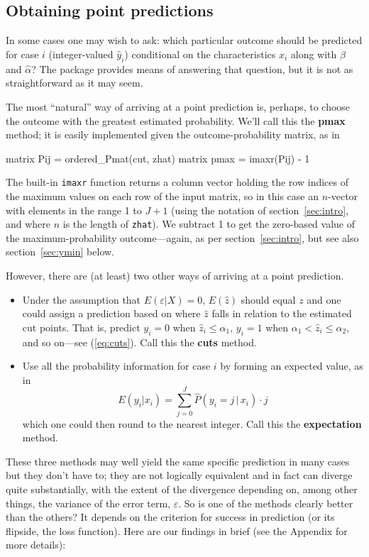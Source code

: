 \documentclass{article}
\begin{document}
\subsection{Obtaining point predictions}
\label{sec:point-pred}

In some cases one may wish to ask: which particular outcome should be
predicted for case $i$ (integer-valued $\hat{y}_i$) conditional on the
characteristics $x_i$ along with $\hat\beta$ and $\hat\alpha$? The
package provides means of answering that question, but it is not as
straightforward as it may seem.

The most ``natural'' way of arriving at a point prediction is,
perhaps, to choose the outcome with the greatest estimated
probability. We'll call this the \textbf{pmax} method; it is easily
implemented given the outcome-probability matrix, as in
\begin{code}
matrix Pij = ordered_Pmat(cut, zhat)
matrix pmax = imaxr(Pij) - 1
\end{code}
The built-in \texttt{imaxr} function returns a column vector holding
the row indices of the maximum values on each row of the input matrix,
so in this case an $n$-vector with elements in the range 1 to $J+1$
(using the notation of section~\ref{sec:intro}, and where $n$ is the
length of \texttt{zhat}). We subtract 1 to get the zero-based value of
the maximum-probability outcome---again, as per
section~\ref{sec:intro}, but see also section~\ref{sec:ymin} below.

However, there are (at least) two other ways of arriving at a point
prediction.
\begin{itemize}
\item Under the assumption that $E(\varepsilon|X) = 0$,
  $E(\hat{z})$ should equal $z$ and one could assign a prediction
  based on where $\hat{z}$ falls in relation to the estimated cut
  points. That is, predict $y_i = 0$ when $\hat{z}_i \leq \alpha_1$,
  $y_i = 1$ when $\alpha_1 < \hat{z}_i \leq \alpha_2$, and so on---see
  (\ref{eq:cuts}). Call this the \textbf{cuts} method.
\item Use all the probability information for case $i$ by forming an
  expected value, as in
  \[
    E(y_i|x_i) = \sum_{j=0}^J \hat{P}(y_i = j \,|\, x_i)\cdot j
  \]
  which one could then round to the nearest integer. Call this the
  \textbf{expectation} method.
\end{itemize}

These three methods may well yield the same specific prediction in
many cases but they don't have to; they are not logically equivalent
and in fact can diverge quite substantially, with the extent of
the divergence depending on, among other things, the variance of the
error term, $\varepsilon$. So is one of the methods clearly better
than the others? It depends on the criterion for success in prediction
(or its flipside, the loss function). Here are our findings in brief
(see the Appendix for more details):
\end{document}
